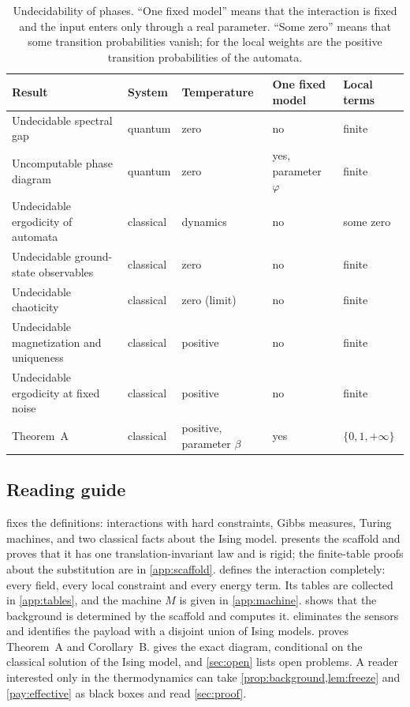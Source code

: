 \begin{table}[ht]
\centering
\small
\begin{tabularx}{\textwidth}{@{}>{\raggedright\arraybackslash}X>{\raggedright\arraybackslash}p{2.1cm}>{\raggedright\arraybackslash}p{2.3cm}>{\raggedright\arraybackslash}p{2.6cm}>{\raggedright\arraybackslash}p{2.0cm}@{}}
\toprule
Result & System & Temperature & One fixed model & Local terms\\
\midrule
Undecidable spectral gap \cite{CPGW15,CPGW22} & quantum & zero & no & finite\\
Uncomputable phase diagram \cite{BCW21} & quantum & zero & yes, parameter $\varphi$ & finite\\
Undecidable ergodicity of automata \cite{Kurdyumov78,Toom00} & classical & dynamics & no & some zero\\
Undecidable ground-state observables \cite{GWPN09} & classical & zero & no & finite\\
Undecidable chaoticity \cite{GST25} & classical & zero (limit) & no & finite\\
Undecidable magnetization and uniqueness \cite{DM26thermal} & classical & positive & no & finite\\
Undecidable ergodicity at fixed noise \cite{DM26forget} & classical & positive & no & finite\\
Theorem~A & classical & positive, parameter $\beta$ & yes & $\{0,1,+\infty\}$\\
\bottomrule
\end{tabularx}
\caption{Undecidability of phases. ``One fixed model'' means that the interaction is fixed and the input enters only through a real parameter. ``Some zero'' means that some transition probabilities vanish; for \cite{DM26forget} the local weights are the positive transition probabilities of the automata.}
\label{tab:landscape}
\end{table}

\subsection{Reading guide}

 fixes the definitions: interactions with hard constraints, Gibbs measures, Turing machines, and two classical facts about the Ising model.  presents the scaffold and proves that it has one translation-invariant law and is rigid; the finite-table proofs about the substitution are in \cref{app:scaffold}.  defines the interaction completely: every field, every local constraint and every energy term. Its tables are collected in \cref{app:tables}, and the machine $M$ is given in \cref{app:machine}.  shows that the background is determined by the scaffold and computes it.  eliminates the sensors and identifies the payload with a disjoint union of Ising models.  proves Theorem~A and Corollary~B.  gives the exact diagram, conditional on the classical solution of the Ising model, and \cref{sec:open} lists open problems. A reader interested only in the thermodynamics can take \cref{prop:background,lem:freeze} and \cref{pay:effective} as black boxes and read \cref{sec:proof}.
